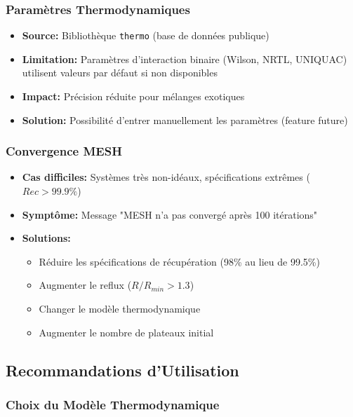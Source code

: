 \documentclass[11pt,a4paper]{article}
\newcommand{\code}[1]{\texttt{#1}}
\begin{document}
\subsubsection{Paramètres Thermodynamiques}

\begin{itemize}[leftmargin=*]
    \item \textbf{Source:} Bibliothèque \code{thermo} (base de données publique)
    \item \textbf{Limitation:} Paramètres d'interaction binaire (Wilson, NRTL, UNIQUAC) utilisent valeurs par défaut si non disponibles
    \item \textbf{Impact:} Précision réduite pour mélanges exotiques
    \item \textbf{Solution:} Possibilité d'entrer manuellement les paramètres (feature future)
\end{itemize}

\subsubsection{Convergence MESH}

\begin{itemize}[leftmargin=*]
    \item \textbf{Cas difficiles:} Systèmes très non-idéaux, spécifications extrêmes ($Rec > 99.9\%$)
    \item \textbf{Symptôme:} Message "MESH n'a pas convergé après 100 itérations"
    \item \textbf{Solutions:}
    \begin{itemize}
        \item Réduire les spécifications de récupération (98\% au lieu de 99.5\%)
        \item Augmenter le reflux ($R/R_{min} > 1.3$)
        \item Changer le modèle thermodynamique
        \item Augmenter le nombre de plateaux initial
    \end{itemize}
\end{itemize}

\subsection{Recommandations d'Utilisation}

\subsubsection{Choix du Modèle Thermodynamique}
\end{document}
